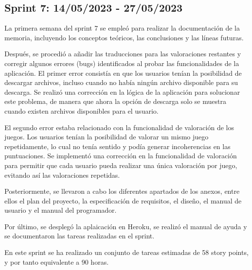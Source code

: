 \subsection{Sprint 7: 14/05/2023 - 27/05/2023}
La primera semana del sprint 7 se empleó para realizar la documentación de la memoria, incluyendo los conceptos teóricos, las conclusiones y las líneas futuras.

Después, se procedió a añadir las traducciones para las valoraciones restantes y corregir algunos errores (bugs) identificados al probar las funcionalidades de la aplicación. 
El primer error consistía en que los usuarios tenían la posibilidad de descargar archivos, incluso cuando no había ningún archivo disponible para su descarga. Se realizó una corrección en la lógica de la aplicación para solucionar este problema, de manera que ahora la opción de descarga solo se muestra cuando existen archivos disponibles para el usuario.

El segundo error estaba relacionado con la funcionalidad de valoración de los juegos. Los usuarios tenían la posibilidad de valorar un mismo juego repetidamente, lo cual no tenía sentido y podía generar incoherencias en las puntuaciones. Se implementó una corrección en la funcionalidad de valoración para permitir que cada usuario pueda realizar una única valoración por juego, evitando así las valoraciones repetidas.

Posteriormente, se llevaron a cabo los diferentes apartados de los anexos, entre ellos el plan del proyecto, la especificación de requisitos, el diseño, el manual de usuario y el manual del programador.

Por último, se desplegó la aplaicación en Heroku, se realizó el manual de ayuda y se documentaron las tareas realizadas en el sprint.

En este sprint se ha realizado un conjunto de tareas estimadas de 58 story points, y por tanto equivalente a 90 horas.

